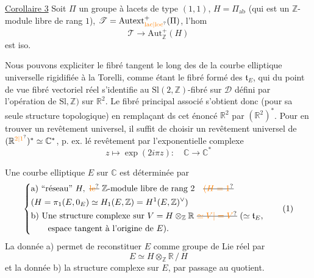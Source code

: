 \uline{Corollaire 3} Soit $\Pi$ un groupe à lacets de type  $(1,1)$, $H=\Pi_{\mathrm{ab}}$ (qui est un $\mathbb Z$-module libre de rang $1$), $\mathscr T=\mathrm{Autext}_{\unsure{\mathrm{lac}|\mathrm{loc}}}^+(\Pi)$,  l'hom
\[
 \mathscr T\longrightarrow\mathrm{Aut}_{\mathbb Z}^+(H) \tag*{(28)}
\]
est iso.


Nous pouvons expliciter le fibré tangent le long des   de la courbe elliptique universelle rigidifiée à la Torelli, comme étant le fibré formé des $\mathfrak{t}_E$, qui du point de vue fibré vectoriel réel s'identifie au  $\mathrm{Sl}(2,\mathbb{Z})$-fibré sur $\mathscr D$ défini par l'opération  de $\mathrm{Sl},\mathbb{Z})$ sur $\mathbb{R}^2$. Le fibré principal associé  s'obtient donc (pour sa seule structure topologique) en remplaçant ds cet énoncé $\mathbb{R}^{2}$ par $(\mathbb{R}^2)^*$. Pour en trouver un revêtement universel, il suffit de choisir un revêtement universel de $(\mathbb{R}^{\unsure{2|1}})^*\simeq\mathbb{C}^*$, p. ex. lé revêtement par l'exponentielle complexe
\[
z\mapsto\exp(2i\pi z):\quad\mathbb{C}\longrightarrow\mathbb{C}^*
\]


Une courbe elliptique $E$ sur $\mathbb{C}$ est déterminée par
\[
\left\{\begin{aligned}
&\text{a) ``réseau'' }H,\ \deleted{\unsure{\text{le}}}\ \mathbb{Z}\text{-module libre de rang }2\quad\deleted{\unsure{(H=1}}\\
&(H=\pi_1(E,0_E)\simeq H_1(E,\mathbb{Z})=H^1(E,\mathbb{Z})^\vee)\\
&\text{b) Une structure complexe sur }V=H\otimes_{\mathbb{Z}}\mathbb{R}\ \deleted{\unsure{\simeq V|=V}}\ (\simeq\mathfrak{t}_E,\\
&\qquad\text{espace tangent à l'origine de }E).
\end{aligned}\right.
\tag*{(1)}
\]
La donnée a) permet de reconstituer $E$ comme groupe de Lie réel par
\[
E\simeq H\otimes_{\mathbb{Z}}\mathbb{R}\,/\,H
\tag*{(2)}
\]
et la donnée b)  la structure complexe sur $E$, par passage au quotient.

